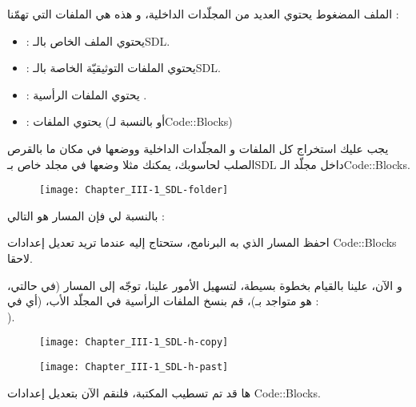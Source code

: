 الملف المضغوط يحتوي العديد من المجلّدات الداخلية، و هذه هي الملفات التي تهمّنا :

\begin{itemize}
	\item {} :
	يحتوي الملف 
	الخاص بالـ\textenglish{SDL}.
	\item {} :
	يحتوي الملفات التوثيقيّة الخاصة بالـ\textenglish{SDL}.
	\item {} :
	يحتوي الملفات الرأسية
	.
	\item {} :
	يحتوي الملفات 
	(أو
	بالنسبة لـ\textenglish{Code::Blocks})
\end{itemize}

يجب عليك استخراج كل الملفات و المجلّدات الداخلية ووضعها في مكان ما بالقرص الصلب لحاسوبك، يمكنك مثلا وضعها في مجلد خاص بـ\textenglish{SDL}
داخل مجلّد الـ\textenglish{Code::Blocks}.

\begin{figure}[H]
	\centering
	\texttt{[image: Chapter\_III-1\_SDL-folder]}
\end{figure}


بالنسبة لي فإن المسار هو التالي :


احفظ المسار الذي به البرنامج، ستحتاج إليه عندما تريد تعديل إعدادات 
\textenglish{Code::Blocks}
لاحقا.

و الآن، علينا بالقيام بخطوة بسيطة، لتسهيل الأمور علينا، توجّه إلى المسار
(في حالتي، هو متواجد بـ)،
قم بنسخ الملفات الرأسية
 في المجلّد الأب، (أي في :\\ 
).

\begin{figure}[H]
	\centering
	\texttt{[image: Chapter\_III-1\_SDL-h-copy]}
\end{figure}
\begin{figure}[H]
	\centering
	\texttt{[image: Chapter\_III-1\_SDL-h-past]}
\end{figure}

ها قد تم تسطيب المكتبة، فلنقم الآن بتعديل إعدادات
\textenglish{Code::Blocks}.

